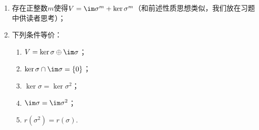 \begin{enumerate}
\begin{proof}
\begin{enumerate}
                        这一点表明核空间随着线性变换的幂次增长而增长（至少不减），下面一点将说明这一不减序列一旦某个包含符号可以取等号，那么此后的项都相等.

                  \item 任取$k>0$，由（1）可知$\ker \sigma^{m+k}\subseteq\ker \sigma^{m+k+1}$，故只需证$\ker \sigma^{m+k+1}\subseteq\ker\sigma^{m+k}$. 事实上，设$\alpha\in\ker \sigma^{m+k+1}$，则$0=\sigma^{m+k+1}(\alpha)=\sigma^{m+1}(\sigma^k(\alpha))$，即$\sigma^k(\alpha)\in\ker\sigma^{m+1}$. 又$\ker \sigma^m=\ker \sigma^{m+1}$，则$\sigma^k(\alpha)\in\ker\sigma^m\implies\sigma^m(\sigma^k(\alpha))=0\implies\sigma^{m+k}(\alpha)=0\implies\alpha\in\ker\sigma^{m+k}$，故$\ker \sigma^{m+k+1}\subseteq\ker\sigma^{m+k}$，因此$\ker \sigma^{m+k+1}=\ker\sigma^{m+k}$，故$\ker \sigma^m=\ker \sigma^{m+1}=\ker \sigma^{m+2}=\ker \sigma^{m+3}=\cdots$.

                  \item 由上一点知我们只需证$\ker \sigma^n=\ker \sigma^{n+1}$. 反证法，若$\{0\}=\ker\sigma^0\subsetneqq\ker\sigma^1\subsetneqq\cdots\subsetneqq\ker\sigma^{n+1}$，则这一递增链条每处严格包含于的维数必然增加1，因此$\dim\ker\sigma^{n+1}\geqslant n+1>n$，但我们知道$\ker\sigma^{n+1}$是$V$的子空间，因此矛盾！故命题成立.
              \end{enumerate}
          \end{proof}
          对于像空间而言也有类似于\autoref{thm:核空间性质} 的定理，证明方法也是类似的，我们放在习题中供读者思考.

    \item 存在正整数$m$使得$V=\im \sigma^m+\ker\sigma^m$（和前述性质思想类似，我们放在习题中供读者思考）；

    \item 下列条件等价：
          \begin{enumerate}
              \item $V=\ker\sigma\oplus\im \sigma$；

              \item $\ker\sigma \cap \im \sigma=\{0\}$；

              \item $\ker\sigma=\ker\sigma^2$；

              \item $\im \sigma=\im \sigma^2$；

              \item $r(\sigma^2)=r(\sigma)$.
          \end{enumerate}


\end{enumerate}
